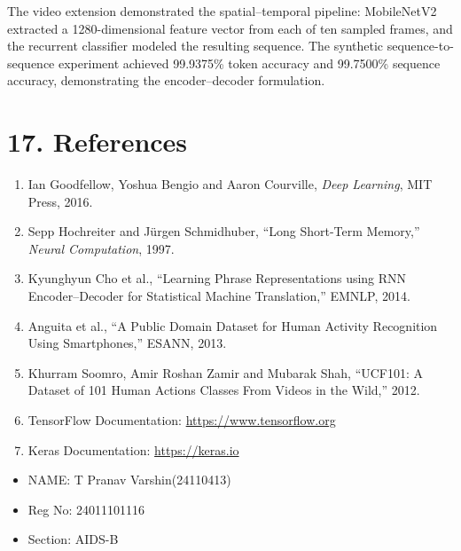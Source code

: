 \documentclass[10pt]{article}
\begin{document}
The video extension demonstrated the spatial--temporal pipeline: MobileNetV2 extracted a 1280-dimensional feature vector from each of ten sampled frames, and the recurrent classifier modeled the resulting sequence. The synthetic sequence-to-sequence experiment achieved 99.9375\% token accuracy and 99.7500\% sequence accuracy, demonstrating the encoder--decoder formulation.

\section*{17. References}
\begin{enumerate}
\item Ian Goodfellow, Yoshua Bengio and Aaron Courville, \emph{Deep Learning}, MIT Press, 2016.
\item Sepp Hochreiter and Jürgen Schmidhuber, ``Long Short-Term Memory,'' \emph{Neural Computation}, 1997.
\item Kyunghyun Cho et al., ``Learning Phrase Representations using RNN Encoder--Decoder for Statistical Machine Translation,'' EMNLP, 2014.
\item Anguita et al., ``A Public Domain Dataset for Human Activity Recognition Using Smartphones,'' ESANN, 2013.
\item Khurram Soomro, Amir Roshan Zamir and Mubarak Shah, ``UCF101: A Dataset of 101 Human Actions Classes From Videos in the Wild,'' 2012.
\item TensorFlow Documentation: \url{https://www.tensorflow.org}
\item Keras Documentation: \url{https://keras.io}
\end{enumerate}

\vspace{10mm}
\begin{itemize}
    \item NAME: T Pranav Varshin(24110413)
    \item Reg No: 24011101116
    \item Section: AIDS-B
\end{itemize}
\end{document}
